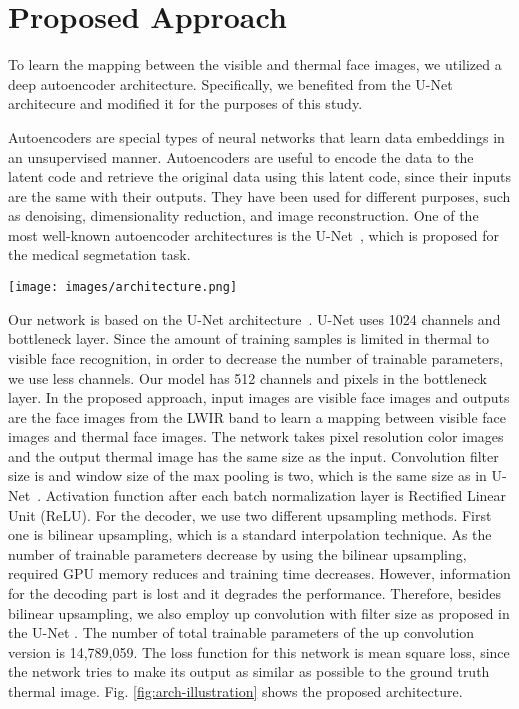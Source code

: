 \documentclass[conference]{IEEEtran}
\begin{document}
\section{Proposed Approach}
To learn the mapping between the visible and thermal face images, we utilized a deep autoencoder architecture. Specifically, we benefited from the U-Net architecure \cite{UNetCN} and modified it for the purposes of this study.



Autoencoders are special types of neural networks that learn data embeddings in an unsupervised manner. Autoencoders are useful to encode the data to the latent code and retrieve the original data using this latent code, since their inputs are the same with their outputs. They have been used for different purposes, such as denoising, dimensionality reduction, and image reconstruction. One of the most well-known autoencoder architectures is the U-Net~\cite{UNetCN}, which is proposed for the medical segmetation task. 

\begin{figure*}[t]
	\centering
	\texttt{[image: images/architecture.png]}
	\caption{\label{fig:arch-illustration}Illustration of the network architecture }
\end{figure*}

Our network is based on the U-Net architecture~\cite{UNetCN}. U-Net uses 1024 channels and  bottleneck layer. Since the amount of training samples is limited in thermal to visible face recognition, in order to decrease the number of trainable parameters, we use less channels. Our model has 512 channels and  pixels in the bottleneck layer. In the proposed approach, input images are visible face images and outputs  are  the face images from the LWIR band to learn a mapping between visible face images and thermal face images. The network takes  pixel resolution color images and the output thermal image has the same size as the input. Convolution filter size is  and window size of the max pooling is two, which is the same size as in U-Net~\cite{UNetCN}. Activation function after each batch normalization layer is Rectified Linear Unit (ReLU). For the decoder, we use two different upsampling methods. First one is bilinear upsampling, which is a standard interpolation technique. As the number of trainable parameters decrease by using the bilinear upsampling, required GPU memory reduces and training time decreases. However, information for the decoding part is lost and it degrades the performance. Therefore, besides bilinear upsampling, we also employ up convolution with  filter size as proposed in the U-Net \cite{UNetCN}. The number of total trainable parameters of the up convolution version is 14,789,059. The loss function for this network is mean square loss, since the network tries to make its output as similar as possible to the ground truth thermal image. Fig. \ref{fig:arch-illustration} shows the proposed architecture. 
\end{document}
